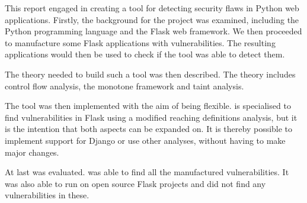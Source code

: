 This report engaged in creating a tool for detecting security flaws in Python web applications.
Firstly, the background for the project was examined, including the Python programming language and the Flask web framework.
We then proceeded to manufacture some Flask applications with vulnerabilities.
The resulting applications would then be used to check if the tool was able to detect them.

The theory needed to build such a tool was then described.
The theory includes control flow analysis, the monotone framework and taint analysis.

The tool \pyt{} was then implemented with the aim of being flexible.
\pyt{} is specialised to find vulnerabilities in Flask using a modified reaching definitions analysis, but it is the intention that both aspects can be expanded on.
It is thereby possible to implement support for Django or use other analyses, without having to make major changes.

At last \pyt{} was evaluated.
\pyt{} was able to find all the manufactured vulnerabilities.
It was also able to run on open source Flask projects and did not find any vulnerabilities in these.
